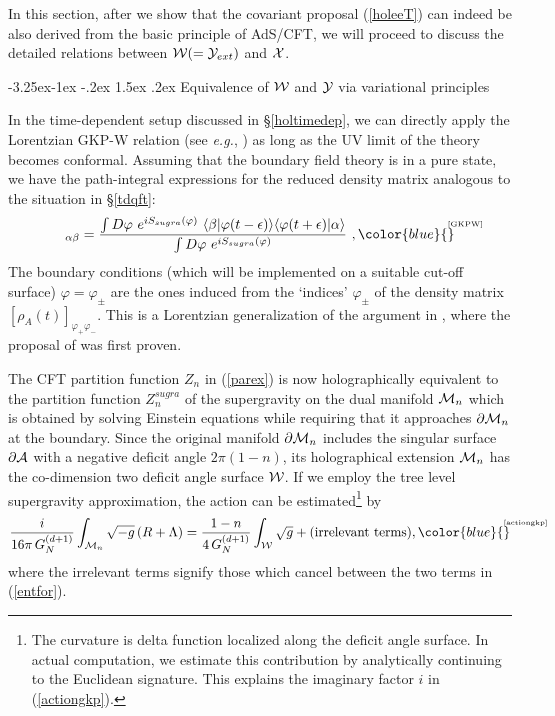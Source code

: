 \documentclass[12pt]{article}
\makeatletter
\renewcommand\subsection{\@startsection{subsection}{2}{\z@}%
                                     {-3.25ex\@plus -1ex \@minus -.2ex}%
                                     {1.5ex \@plus .2ex}%
                                     {\normalfont\bfseries}}
\newcommand{\be}{\begin{equation}}
\newcommand{\ee}{\end{equation}}
\def\sec#1{\S \;\ref{#1}}
\def\req#1{(\ref{#1})}
\def\eg{{\it e.g.}}
\def\vp{\varphi}
\def\s{\sigma}
\def\CW{{\cal W}}
\def\CX{{\cal X}}
\def\CY{{\cal Y}}
\def\f#1#2{{\frac{#1}{#2}}}
\def\f#1#2{{\frac{#1}{#2}}}
\def\Label#1{\label{#1}%
{ \color{blue}{\smash{\hbox to0pt{\raise2ex\hbox{\tiny[#1]}\hss}}}}}
\def\bulk{{\cal M}}
\def\Gms{\CW}
\def\Lms{\CY}
\def\Xms{\CX}
\def\s{\sqrt}
\def\de{\partial}
\def\f {\frac}
\def\ap{\alpha}
\def\la{\langle}
\def\lb{\rangle}
\def\ep{\epsilon}
\def\vp{\varphi}
\makeatother
\begin{document}
In this section, after we show that the covariant proposal
(\ref{holeeT}) can indeed be also derived from the basic principle
of AdS/CFT, we will
  proceed to discuss the detailed relations between $\Gms(=\Lms_{ext})$ and
  $\Xms$.

\subsection{Equivalence of $\Gms$ and $\Lms$ via variational principles}
\label{gkpmotive}


In the time-dependent setup discussed in \sec{holtimedep}, we can
 directly apply the Lorentzian GKP-W relation  (see \eg,  \cite{Marolf:2004fy}) as
long as the UV limit of the theory becomes conformal. Assuming that
the boundary field theory is in a pure state, we have the
path-integral expressions for the reduced density matrix analogous
to the situation in \sec{tdqft}:
%
\be [\rho_A(t)]_{\ap
\beta}=\f{\int D\vp~ e^{iS_{sugra}(\vp)}~ \la \beta |\vp(t-\ep)\lb
\la \vp(t+\ep) | \ap \lb} {\int D\vp~
e^{iS_{sugra}(\vp)}} \ ,
\Label{GKPW}
\ee
%
 The boundary conditions (which will be implemented on a suitable cut-off surface) $\vp=\vp_{\pm}$ are the ones induced from the `indices'
$\vp_{\pm}$ of the density matrix $[\rho_A(t)]_{\vp_+ \vp_-}$. This
is a Lorentzian generalization of the argument in
\cite{Fursaev:2006ih}, where the proposal of \cite{Ryu:2006bv,
Ryu:2006ef} was first proven.

The CFT partition function $Z_n$ in \req{parex} is now
holographically equivalent to the partition function $Z^{sugra}_{n}$
of the supergravity on the dual manifold ${\cal M}_n$ which is
obtained by solving Einstein equations while requiring that it approaches
$\de{\cal{M}}_n$ at the boundary. Since the original
manifold $\de{\cal{M}}_n$ includes the singular surface $\de {\cal
A}$ with a negative deficit angle $2\pi(1-n)$, its holographical
extension ${\cal M}_n$ has the co-dimension two deficit angle surface
$\Gms$.
If we employ the tree level supergravity approximation, the action can be
estimated\footnote{The curvature is delta function localized
along the deficit angle surface. In actual computation, we estimate
this contribution by analytically continuing to the Euclidean
signature. This explains the imaginary factor $i$ in
\req{actiongkp}.} by
%
\be
\f{i}{16\pi\, G_N^{(d+1)}}\int_{\bulk_n}
\s{-g}\,(R+\Lambda)=\f{1-n}{4\, G_N^{(d+1)}}\int_{\Gms}\s{g}+(\mbox{irrelevant
terms}),
\Label{actiongkp}
\ee
%
where the irrelevant terms signify those
which cancel between the two terms in \req{entfor}.
\end{document}
